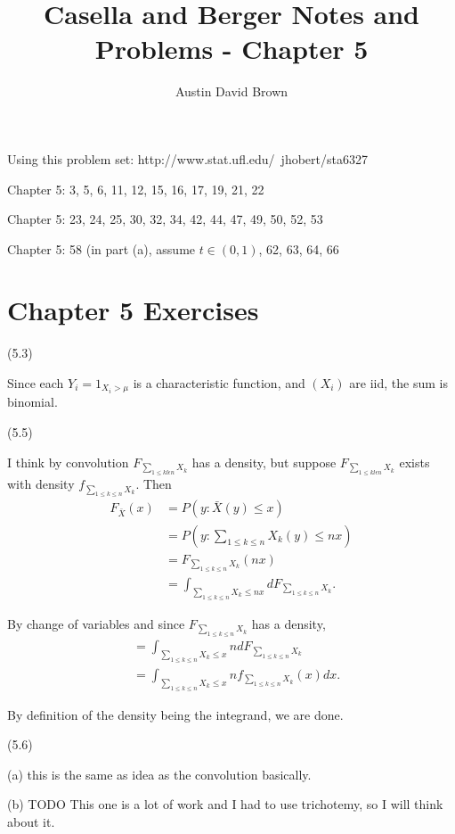 \documentclass[12pt, reqno]{amsart}
\numberwithin{equation}{section}
\newcommand{\e}{\epsilon}
\newcommand{\mean}{\bar}
\begin{document}
\title{Casella and Berger Notes and Problems -  Chapter 5}
\author{Austin David Brown}
\maketitle


Using this problem set:
http://www.stat.ufl.edu/~jhobert/sta6327

Chapter 5: 3, 5, 6, 11, 12, 15, 16, 17, 19, 21, 22

Chapter 5: 23, 24, 25, 30, 32, 34, 42, 44, 47, 49, 50, 52, 53

Chapter 5: 58 (in part (a), assume $t \in (0,1)$, 62, 63, 64, 66

\section*{Chapter 5 Exercises}

(5.3)

Since each $Y_i = 1_{X_i > \mu}$ is a characteristic function, and $(X_i)$ are iid, the sum is binomial.

(5.5)

I think by convolution $F_{\sum_{1 \le k l\e n} X_k}$ has a density, but
suppose $F_{\sum_{1 \le k l\e n} X_k}$ exists with density $f_{\sum_{1 \le k \le n} X_k}$.
Then
\begin{align*}
F_{\mean{X}}(x)
&= P(y : \mean{X}(y) \le x) \\
&= P(y : \sum_{1 \le k \le n}{X_k}(y) \le nx) \\
&= F_{\sum_{1 \le k \le n}{X_k}}(nx) \\
&= \int_{\sum_{1 \le k \le n}{X_k} \le nx} dF_{\sum_{1 \le k \le n}{X_k}} .
\end{align*}

By change of variables and since $F_{\sum_{1 \le k \le n}{X_k}}$ has a density,
\begin{align*}
&= \int_{\sum_{1 \le k \le n}{X_k} \le x} n dF_{\sum_{1 \le k \le n}{X_k}} \\
&= \int_{\sum_{1 \le k \le n}{X_k} \le x} n f_{\sum_{1 \le k \le n}{X_k}}(x) dx.
\end{align*}

By definition of the density being the integrand, we are done.

(5.6)

(a) this is the same as idea  as the convolution basically.

(b) TODO This one is a lot of work and I had to use trichotemy, so I will think about it.
\end{document}
